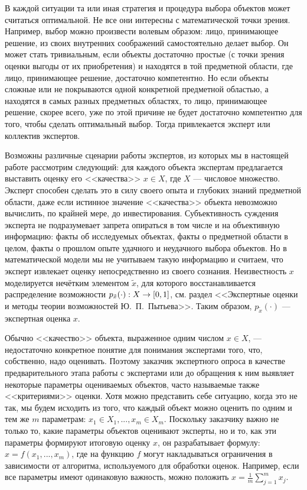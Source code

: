 \documentclass{article}
\begin{document}
В каждой ситуации та или иная стратегия и процедура выбора объектов может считаться оптимальной. Не все они интересны с математической точки зрения. Например, выбор можно произвести волевым образом: лицо, принимающее решение, из своих внутренних соображений самостоятельно делает выбор. Он может стать тривиальным, если объекты достаточно простые (с точки зрения оценки выгоды от их приобретения) и находятся в той предметной области, где лицо, принимающее решение, достаточно компетентно. Но если объекты сложные или не покрываются одной конкретной предметной областью, а находятся в самых разных предметных областях, то лицо, принимающее решение, скорее всего, уже по этой причине не будет достаточно компетентно для того, чтобы сделать оптимальный выбор. Тогда привлекается эксперт или коллектив экспертов.

Возможны различные сценарии работы экспертов, из которых мы в настоящей работе рассмотрим следующий: для каждого объекта экспертам предлагается выставить оценку его <<качества>> $x \in X$, где $X$ --- числовое множество. Эксперт способен сделать это в силу своего опыта и глубоких знаний предметной области, даже если истинное значение <<качества>> объекта невозможно вычислить, по крайней мере, до инвестирования. Субъективность суждения эксперта не подразумевает запрета опираться в том числе и на объективную информацию: факты об исследуемых объектах, факты о предметной области в целом, факты о прошлом опыте удачного и неудачного выбора объектов. Но в математической модели мы не учитываем такую информацию и считаем, что эксперт извлекает оценку непосредственно из своего сознания. Неизвестность $x$ моделируется нечётким элементом $\tilde x$, для которого восстанавливается  распределение возможности $p_{\tilde x}(\cdot): X \rightarrow [0,1]$, см. раздел <<Экспертные оценки и методы теории возможностей Ю.~П.~Пытьева>>. Таким образом, $p_{\tilde x}(\cdot)$ --- экспертная оценка $x$.    

Обычно <<качество>> объекта, выраженное одним числом $x \in X$, --- недостаточно конкретное понятие для понимания экспертами того, что, собственно, надо оценивать. Поэтому заказчик экспертного опроса в качестве предварительного этапа работы с экспертами или до обращения к ним выявляет некоторые параметры оцениваемых объектов, часто называемые также <<критериями>> оценки. Хотя можно представить себе ситуацию, когда это не так, мы будем исходить из того, что каждый объект можно оценить по одним и тем же $m$ параметрам: $x_1 \in X_1, ..., x_m \in X_m$.  Поскольку заказчику важно не только то, какие параметры объектов оценивают эксперты, но и то, как эти параметры формируют итоговую оценку $x$, он разрабатывает формулу: $x = f(x_1, ..., x_m)$, где на функцию $f$ могут накладываться ограничения в зависимости от алгоритма, используемого для обработки оценок. Например, если все параметры имеют одинаковую важность, можно положить $x = \frac{1}{m}\sum_{j=1}^m{x_j}$.
\end{document}
